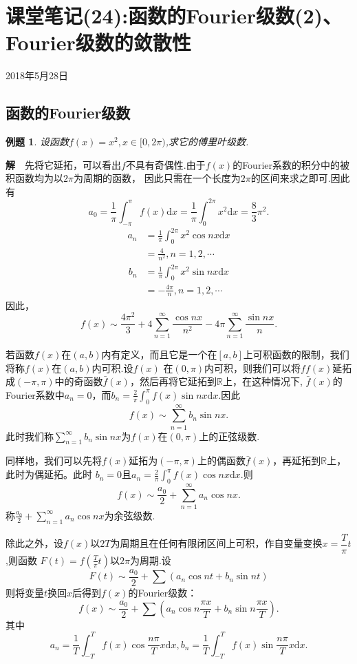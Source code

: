 \documentclass[UTF8]{article}
\newcommand{\R}{\mathbb{R}}
\newcommand{\dx}{\mathrm{d}x}
\newcommand{\jie}{\textbf{解}$\quad$}
\newtheorem{exa}{\hspace{2em}例题}[section]
\begin{document}
  \section{课堂笔记(24):函数的Fourier级数(2)、Fourier级数的敛散性}
  \begin{center}
    2018年5月28日
  \end{center}
  \subsection{函数的Fourier级数}
  \begin{exa}
    设函数$f(x)=x^2,x\in[0,2\pi)$,求它的傅里叶级数.
  \end{exa}
  \jie 先将它延拓，可以看出$f$不具有奇偶性.由于$f(x)$的Fourier系数的积分中的被积函数均为以$2\pi$为周期的函数，
  因此只需在一个长度为$2\pi$的区间来求之即可.因此有
  $$a_0=\frac{1}{\pi}\int_{-\pi}^{\pi}f(x)\dx=\frac{1}{\pi}\int_{0}^{2\pi}x^2\dx=\frac{8}{3}\pi^2.$$
  \begin{align*}
    a_n&=\frac{1}{\pi}\int_{0}^{2\pi}x^2\cos nx\dx\\
    &=\frac{4}{n^2},n=1,2,\cdots
  \end{align*}
  \begin{align*}
    b_n&=\frac{1}{\pi}\int_{0}^{2\pi}x^2\sin nx\dx\\
    &=-\frac{4\pi}{n},n=1,2,\cdots
  \end{align*}
  因此，
  $$f(x)\sim \frac{4\pi^2}{3}+4\sum_{n=1}^\infty\frac{\cos nx}{n^2}-4\pi\sum_{n=1}^\infty\frac{\sin nx}{n}.$$

  若函数$f(x)$在$(a,b)$内有定义，而且它是一个在$[a,b]$上可积函数的限制，我们将称$f(x)$在$(a,b)$内可积.设$f(x)$
  在$(0,\pi)$内可积，则我们可以将$ff(x)$延拓成$(-\pi,\pi)$中的奇函数$\bar{f}(x)$，然后再将它延拓到$\R$上，在这种情况下,
  $\bar{f}(x)$的Fourier系数中$a_n=0$，而$b_n=\frac{2}{\pi}\int_0^\pi f(x)\sin nx\dx.$因此
  $$f(x)\sim \sum_{n=1}^\infty b_n\sin nx.$$
  此时我们称$\sum_{n=1}^\infty b_n\sin nx$为$f(x)$在$(0,\pi)$上的正弦级数.

  同样地，我们可以先将$f(x)$延拓为$(-\pi,\pi)$上的偶函数$\bar{f}(x)$，再延拓到$\R$上，此时为偶延拓。此时
  $b_n=0$且$a_n=\frac{2}{\pi}\int_0^\pi f(x)\cos nx\dx.$则
  $$f(x)\sim \frac{a_0}{2}+\sum_{n=1}^\infty a_n\cos nx.$$
  称$\frac{a_0}{2}+\sum_{n=1}^\infty a_n\cos nx$为余弦级数.

  除此之外，设$f(x)$以$2T$为周期且在任何有限闭区间上可积，作自变量变换$x=\dfrac{T}{\pi}t$,则函数
  $F(t)=f(\frac{T}{\pi}t)$以$2\pi$为周期.设
  $$F(t)\sim \frac{a_0}{2}+\sum(a_n\cos nt+b_n\sin nt)$$
  则将变量$t$换回$x$后得到$f(x)$的Fourier级数：
  $$f(x)\sim \frac{a_0}{2}+\sum(a_n\cos n\frac{\pi x}{T}+b_n\sin n\frac{\pi x}{T}).$$
  其中
  $$a_n=\frac{1}{T}\int_{-T}^{T}f(x)\cos\frac{n\pi}{T}x\dx,b_n=\frac{1}{T}\int_{-T}^{T}f(x)\sin\frac{n\pi}{T}x\dx.$$
\end{document}

